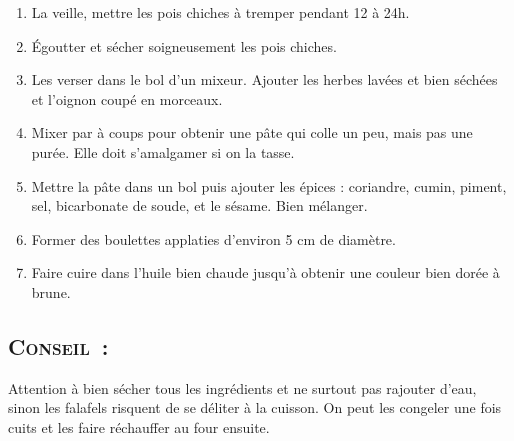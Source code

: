 \begin{enumerate}
\item La veille, mettre les pois chiches à tremper pendant 12 à 24h.

\item Égoutter et sécher soigneusement les pois chiches.

\item Les verser dans le bol d'un mixeur. Ajouter les herbes lavées et bien séchées et l'oignon coupé en morceaux.

\item Mixer par à coups pour obtenir une pâte qui colle un peu, mais pas une purée. Elle doit s'amalgamer si on la tasse.

\item Mettre la pâte dans un bol puis ajouter les épices : coriandre, cumin, piment, sel, bicarbonate de soude, et le sésame. Bien mélanger.

\item Former des boulettes applaties d'environ 5 cm de diamètre.

\item Faire cuire dans l'huile bien chaude jusqu'à obtenir une couleur bien dorée à brune.
\end{enumerate}


\subsection*{\textsc{Conseil~:}}
Attention à bien sécher tous les ingrédients et ne surtout pas rajouter d'eau, sinon les falafels risquent de se déliter à la cuisson.
On peut les congeler une fois cuits et les faire réchauffer au four ensuite.


